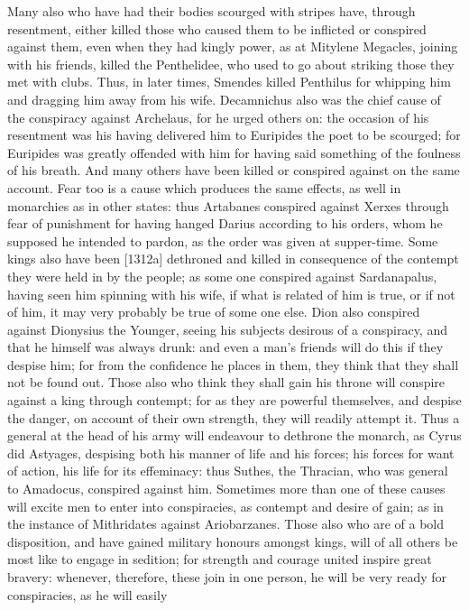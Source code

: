 Many also who have had their bodies scourged with stripes have, through
resentment, either killed those who caused them to be inflicted or
conspired against them, even when they had kingly power, as at Mitylene
Megacles, joining with his friends, killed the Penthelidee, who used to go
about striking those they met with clubs. Thus, in later times, Smendes
killed Penthilus for whipping him and dragging him away from his wife.
Decamnichus also was the chief cause of the conspiracy against Archelaus,
for he urged others on: the occasion of his resentment was his having
delivered him to Euripides the poet to be scourged; for Euripides was
greatly offended with him for having said something of the foulness of his
breath. And many others have been killed or conspired against on the same
account. Fear too is a cause which produces the same effects, as well in
monarchies as in other states: thus Artabanes conspired against Xerxes
through fear of punishment for having hanged Darius according to his
orders, whom he supposed he intended to pardon, as the order was given at
supper-time. Some kings also have been [1312a] dethroned and killed in
consequence of the contempt they were held in by the people; as some one
conspired against Sardanapalus, having seen him spinning with his wife, if
what is related of him is true, or if not of him, it may very probably be
true of some one else. Dion also conspired against Dionysius the Younger,
seeing his subjects desirous of a conspiracy, and that he himself was
always drunk: and even a man's friends will do this if they despise him;
for from the confidence he places in them, they think that they shall not
be found out. Those also who think they shall gain his throne will
conspire against a king through contempt; for as they are powerful
themselves, and despise the danger, on account of their own strength, they
will readily attempt it. Thus a general at the head of his army will
endeavour to dethrone the monarch, as Cyrus did Astyages, despising both
his manner of life and his forces; his forces for want of action, his life
for its effeminacy: thus Suthes, the Thracian, who was general to
Amadocus, conspired against him. Sometimes more than one of these causes
will excite men to enter into conspiracies, as contempt and desire of
gain; as in the instance of Mithridates against Ariobarzanes. Those also
who are of a bold disposition, and have gained military honours amongst
kings, will of all others be most like to engage in sedition; for strength
and courage united inspire great bravery: whenever, therefore, these join
in one person, he will be very ready for conspiracies, as he will easily
